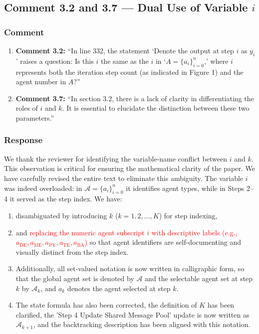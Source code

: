 \documentclass[11pt,a4paper]{article}
\begin{document}
\subsection{Comment 3.2 and 3.7 --- Dual Use of Variable $i$}

\subsubsection{Comment}
\begin{enumerate}
\item \textbf{Comment 3.2: } ``In line 332, the statement `Denote the output at step $i$ as $y_i$' raises a question: Is this $i$ the same as the $i$ in `$A = \{a_i\}^n_{i=0}$,' where $i$ represents both the iteration step count (as indicated in Figure 1) and the agent number in $A$?''
\item \textbf{Comment 3.7: } ``In section 3.2, there is a lack of clarity in differentiating the roles of $i$ and $k$. It is essential to elucidate the distinction between these two parameters.''
\end{enumerate}

\subsubsection{Response}
We thank the reviewer for identifying the variable-name conflict between $i$ and $k$. This observation is critical for ensuring the mathematical clarity of the paper. We have carefully revised the entire text to eliminate this ambiguity. The variable $i$ was indeed overloaded: in $\mathcal{A}=\{a_i\}_{i=0}^n$ it identifies agent types, while in Steps 2--4 it served as the step index. We have:
\begin{enumerate}
\item disambiguated by introducing $k$ ($k=1,2,\ldots,K$) for step indexing, 
\item and \textcolor{red}{replacing the numeric agent subscript $i$ with descriptive labels (e.g., $a_{\text{DE}}, a_{\text{ME}}, a_{\text{PY}}, a_{\text{TE}}, a_{\text{BA}}$)} so that agent identifiers are self-documenting and visually distinct from the step index. 
\item  Additionally, all set-valued notation is now written in calligraphic form, so that the global agent set is denoted by $\mathcal{A}$ and the selectable agent set at step $k$ by $\mathcal{A}_k$, and $a_k$ denotes the agent selected at step $k$. 
\item  The state formula has also been corrected, the definition of $K$ has been clarified, the 'Step 4 Update Shared Message Pool' update is now written as $\mathcal{A}_{k+1}$, and the backtracking description has been aligned with this notation.
\end{enumerate}
\end{document}
